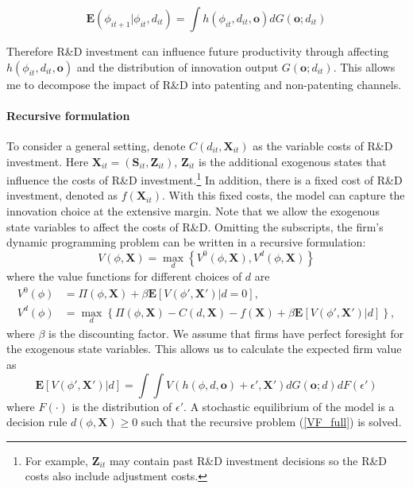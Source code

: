 \documentclass[11pt]{article}
\begin{document}
\begin{equation*}
    \mathbf{E}(\phi_{it+1}|\phi_{it}, d_{it})=\int h(\phi_{it},d_{it},\mathbf{o})dG(\mathbf{o};d_{it})
\end{equation*}

Therefore R\&D investment can influence future productivity through affecting $h(\phi_{it}, d_{it},\mathbf{o})$ and the distribution of innovation output $G(\mathbf{o}; d_{it})$. This allows me to decompose the impact of R\&D into patenting and non-patenting channels.

\paragraph{Recursive formulation}
To consider a general setting, denote $C(d_{it}, \mathbf{X}_{it})$ as the variable costs of R\&D investment. Here $\mathbf{X}_{it}=(\mathbf{S}_{it}, \mathbf{Z}_{it})$, $\mathbf{Z}_{it}$ is the additional exogenous states that influence the costs of R\&D investment.\footnote{For example, $\mathbf{Z}_{it}$ may contain past R\&D investment decisions so the R\&D costs also include adjustment costs.} In addition, there is a fixed cost of R\&D investment, denoted as $f(\mathbf{X}_{it})$. With this fixed costs, the model can capture the innovation choice at the extensive margin. Note that we allow the exogenous state variables to affect the costs of R\&D. Omitting the subscripts, the firm's dynamic programming problem can be written in a recursive formulation:
\begin{equation}\label{VF_full}
    V(\phi, \mathbf{X}) =\max_{d}\left\{V^0(\phi, \mathbf{X}), V^d(\phi, \mathbf{X})\right\} 
\end{equation}
where the value functions for different choices of $d$ are
\begin{align}
    V^0(\phi)&=\Pi(\phi,\mathbf{X})+ \beta \mathbf{E}\left[ V(\phi', \mathbf{X}')|d=0\right], \\
    V^d(\phi)&=\max_{d} \left\{ \Pi(\phi,\mathbf{X})-C(d, \mathbf{X}) - f(\mathbf{X}) + \beta \mathbf{E}\left[ V(\phi', \mathbf{X}')|d\right]\right\}, \label{VF_d}
\end{align}
where $\beta$ is the discounting factor. We assume that firms have perfect foresight for the exogenous state variables. This allows us to calculate the expected firm value as
\begin{equation}\label{EV_d}
    \mathbf{E}\left[ V(\phi', \mathbf{X}')|d\right] = \int\int V(h(\phi,d,\mathbf{o})+\epsilon',\mathbf{X}')dG(\mathbf{o};d)dF(\epsilon')
\end{equation}
where $F(\cdot)$ is the distribution of $\epsilon'$. 
A stochastic equilibrium of the model is a decision rule $d(\phi, \mathbf{X})\geq0$ such that the recursive problem (\ref{VF_full}) is solved.
\end{document}
